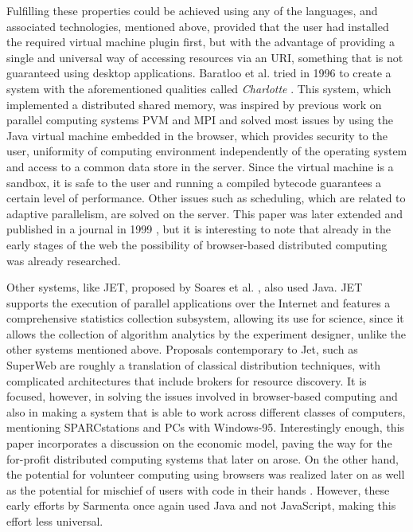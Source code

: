 \documentclass[journal,onecolumn]{IEEEtran}
\begin{document}
Fulfilling these properties could be achieved using any of the
languages, and associated technologies, mentioned above, provided that the user had
installed the required virtual machine plugin first, but with the advantage of
providing a single and universal way of accessing resources via an
URI, something that is not guaranteed using desktop
applications. Baratloo et al. tried in 1996 to create a system with
the aforementioned qualities called {\em Charlotte}
\cite{baratloo1996charlotte}. This system, which implemented a
distributed shared memory, was inspired by previous work
on parallel computing systems PVM and MPI and solved most issues by
using the Java virtual machine embedded in the browser,
which provides
security to the user, uniformity of computing environment
independently of the operating system and access to a common data store in the
server. Since the virtual machine is a sandbox, it is safe to the user
and running a compiled bytecode guarantees a certain level of
performance. 
 Other issues such as scheduling, which are related to adaptive
 parallelism, are solved on the server. This 
paper was later extended and published in a journal in 1999
\cite{baratloo1999charlotte}, but it is interesting to note that
already in the early stages of the web the possibility of
browser-based distributed computing was already researched. 

Other systems, like JET, proposed by Soares et
al. \cite{soares1998get}, also used Java. JET supports 
the execution of parallel applications over the Internet and features
a comprehensive statistics collection subsystem, allowing its use for science,
since it allows the collection of algorithm analytics by the
experiment designer, unlike the other systems mentioned
above. Proposals contemporary to Jet, such as SuperWeb
\cite{alexandrov1997superweb} are roughly a translation of classical
distribution techniques, with complicated architectures that include
brokers for resource discovery. It is focused, however, in solving the
issues involved in browser-based computing and also in making a system
that is able to work across different classes of computers, mentioning
SPARCstations and PCs with Windows-95. Interestingly enough, this
paper incorporates a discussion on the economic model, paving the way
for the for-profit distributed computing systems that later on
arose. On the other hand, the potential for volunteer computing using
browsers was realized 
later on \cite{sarmenta-bayanihan} as well as the potential for
mischief of users with code in their hands
\cite{sarmenta-sabotagetolerance}. However, these early efforts by
Sarmenta once again used Java and not JavaScript, making this effort
less universal.
\end{document}
